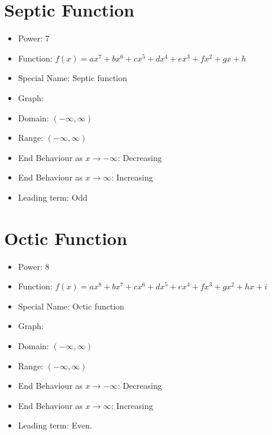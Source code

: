 \documentclass{article}
\begin{document}
\section*{Septic Function}

\begin{itemize}
    \item Power: 7
    \item Function: $f(x) = ax^7 + bx^6 + cx^5 + dx^4 + ex^3 + fx^2 + gx + h$
    \item Special Name: Septic function
    \item Graph:
    
    
    \item Domain: $(-\infty, \infty)$
    \item Range: $(-\infty, \infty)$
    \item End Behaviour as $x \rightarrow -\infty$: Decreasing
    \item End Behaviour as $x \rightarrow \infty$: Increasing
    \item Leading term: Odd
\end{itemize}
\newpage 

\section*{Octic Function}

\begin{itemize}
    \item Power: 8
    \item Function: $f(x) = ax^8 + bx^7 + cx^6 + dx^5 + ex^4 + fx^3 + gx^2 + hx + i$
    \item Special Name: Octic function
    \item Graph:
    

    \item Domain: $(-\infty, \infty)$
    \item Range: $(-\infty, \infty)$
    \item End Behaviour as $x \rightarrow -\infty$: Decreasing
    \item End Behaviour as $x \rightarrow \infty$: Increasing
    \item Leading term: Even.
\end{itemize}
\newpage 
\end{document}
